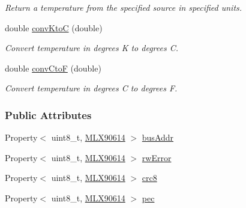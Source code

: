 \begin{DoxyCompactItemize}
\begin{DoxyCompactList}\small\item\em Return a temperature from the specified source in specified units. \end{DoxyCompactList}\item 
double \mbox{\hyperlink{class_m_l_x90614_af0a52019a3c66f0ae3b954a4e7475c88}{conv\+KtoC}} (double)
\begin{DoxyCompactList}\small\item\em Convert temperature in degrees K to degrees C. \end{DoxyCompactList}\item 
double \mbox{\hyperlink{class_m_l_x90614_a2a5b34da155086b85fb74ceb7310b2cb}{conv\+CtoF}} (double)
\begin{DoxyCompactList}\small\item\em Convert temperature in degrees C to degrees F. \end{DoxyCompactList}\end{DoxyCompactItemize}
\subsubsection*{Public Attributes}
\begin{DoxyCompactItemize}
\item 
Property$<$ uint8\+\_\+t, \mbox{\hyperlink{class_m_l_x90614}{M\+L\+X90614}} $>$ \mbox{\hyperlink{class_m_l_x90614_a66d99dc5778b514038c0fa5e25a722f1}{bus\+Addr}}
\item 
Property$<$ uint8\+\_\+t, \mbox{\hyperlink{class_m_l_x90614}{M\+L\+X90614}} $>$ \mbox{\hyperlink{class_m_l_x90614_a13d10b57b4369c27e740585bf3907b0e}{rw\+Error}}
\item 
Property$<$ uint8\+\_\+t, \mbox{\hyperlink{class_m_l_x90614}{M\+L\+X90614}} $>$ \mbox{\hyperlink{class_m_l_x90614_aa13abb960da5f7d8d0eb26df8632a679}{crc8}}
\item 
Property$<$ uint8\+\_\+t, \mbox{\hyperlink{class_m_l_x90614}{M\+L\+X90614}} $>$ \mbox{\hyperlink{class_m_l_x90614_af050e02eecd12a127a98fb2b30e40a88}{pec}}
\end{DoxyCompactItemize}
